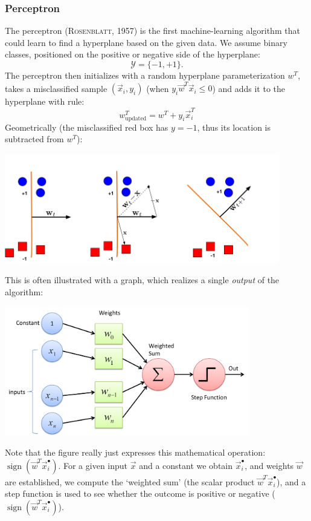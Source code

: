\documentclass{article}
\DeclareMathOperator{\sign}{sign}
\begin{document}
\subsubsection{Perceptron}
The perceptron (\textsc{Rosenblatt}, 1957) is the first machine-learning algorithm that could learn to find a hyperplane based on the given data. We assume binary classes, positioned on the positive or negative side of the hyperplane:
\begin{equation}
    \mathcal{Y} = \{-1,+1\}.
\end{equation}
The perceptron then initializes with a random hyperplane parameterization $w^T$, takes a misclassified sample $(\vec{x}_i,y_i)$ (when $y_i\vec{w}^T\vec{x}_i\leq 0$) and adds it to the hyperplane with rule:
\begin{equation}
    w^T_\text{updated} = w^T + y_i \vec{x}_i^T
\end{equation}
Geometrically (the misclassified red box has $y=-1$, thus its location is subtracted from $w^T$):
\begin{center}\includegraphics[width=0.9\textwidth,trim={0cm 0cm 3.2cm 2cm},clip]{PerceptronUpdate.png}\end{center}
This is often illustrated with a graph, which realizes a single \textit{output} of the algorithm:
\begin{center}\includegraphics[width=0.8\textwidth]{perceptrongraph.png}\end{center}
Note that the figure really just expresses this mathematical operation: $\sign(\vec{w}^T\vec{x}^\bullet_i)$. For a given input $\vec{x}$ and a constant we obtain $\vec{x}^\bullet_i$, and weights $\vec{w}$ are established, we compute the `weighted sum' (the scalar product $\vec{w}^T\vec{x}^\bullet_i$), and a step function is used to see whether the outcome is positive or negative ($\sign(\vec{w}^T\vec{x}^\bullet_i)$).
\end{document}
